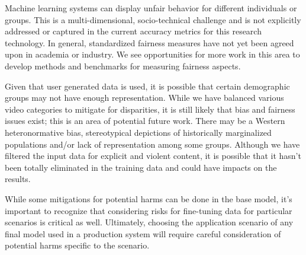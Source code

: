 \documentclass{article}
\begin{document}
Machine learning systems can display unfair behavior for different individuals or groups. This is a multi-dimensional, socio-technical challenge and is not explicitly addressed or captured in the current accuracy metrics for this research technology. In general, standardized fairness measures have not yet been agreed upon in academia or industry. We see opportunities for more work in this area to develop methods and benchmarks for measuring fairness aspects.

Given that user generated data is used, it is possible that certain demographic groups may not have enough representation. While we have balanced various video categories to mitigate for disparities, it is still likely that bias and fairness issues exist; this is an area of potential future work.  There may be a Western heteronormative bias, stereotypical depictions of historically marginalized populations and/or lack of representation among some groups. Although we have filtered the input data for explicit and violent content, it is possible that it hasn’t been totally eliminated in the training data and could have impacts on the results.

While some mitigations for potential harms can be done in the base model, it’s important to recognize that considering risks for fine-tuning data for particular scenarios is critical as well. Ultimately, choosing the application scenario of any final model used in a production system will require careful consideration of potential harms specific to the scenario.  
\end{document}
